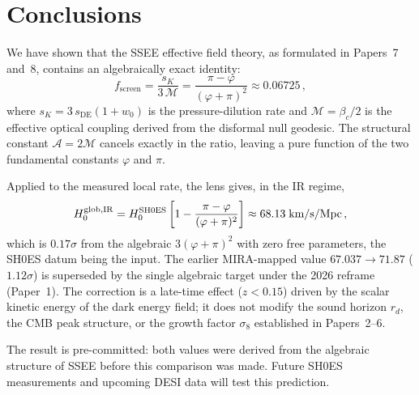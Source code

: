 \documentclass[12pt,a4paper]{article}
\newcommand{\phiG}{\varphi}
\newcommand{\MIRA}{\mathcal{M}}
\newcommand{\AURA}{\mathcal{A}}
\newcommand{\bc}{\beta_c}
\newcommand{\fsc}{f_{\mathrm{screen}}}
\newcommand{\sK}{s_K}          %
\newcommand{\sDE}{s_{\mathrm{DE}}} %
\begin{document}
\section{Conclusions}
\label{sec:conclusions}

We have shown that the SSEE effective field theory, as formulated in
Papers~7 and~8, contains an algebraically exact identity:
\begin{equation}
  \fsc = \frac{\sK}{3\,\MIRA} = \frac{\pi-\phiG}{(\phiG+\pi)^2} \approx 0.06725\,,
\end{equation}
where $\sK = 3\,\sDE(1+w_0)$ is the pressure-dilution rate and
$\MIRA = \bc/2$ is the effective optical coupling derived from the
disformal null geodesic.
The structural constant $\AURA = 2\MIRA$ cancels exactly in the ratio,
leaving a pure function of the two fundamental constants $\phiG$ and $\pi$.

Applied to the measured local rate, the lens gives, in the IR regime,
\begin{equation}
  H_0^{\rm glob,IR} = H_0^{\rm SH0ES}\left[1-\frac{\pi-\phiG}{(\phiG+\pi)^2}\right]
  \approx 68.13\;\text{km/s/Mpc}\,,
\end{equation}
which is $0.17\sigma$ from the algebraic $3(\phiG+\pi)^2$ with zero free
parameters, the SH0ES datum \citep{Riess2022} being the input.
The earlier MIRA-mapped value $67.037\to71.87$ ($1.12\sigma$) is superseded by
the single algebraic target under the 2026 reframe (Paper~1).
The correction is a late-time effect ($z < 0.15$) driven by the scalar
kinetic energy of the dark energy field; it does not modify the sound
horizon $r_d$, the CMB peak structure, or the growth factor $\sigma_8$
established in Papers~2--6.

The result is pre-committed: both values were derived from
the algebraic structure of SSEE before this comparison was made.
Future SH0ES measurements and upcoming DESI \citep{DESI2025} data will test
this prediction.
\end{document}
